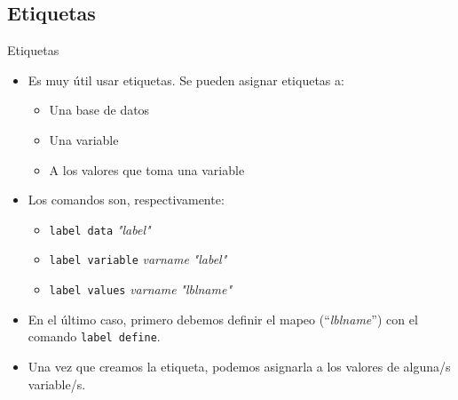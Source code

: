 \documentclass{beamer}
\begin{document}
\subsection{Etiquetas}
\begin{frame}{Etiquetas}
\begin{itemize}
\item Es muy útil usar etiquetas. Se pueden asignar etiquetas a:
\begin{itemize}
\item Una base de datos
\item Una variable
\item A los valores que toma una variable  
\end{itemize}
\item Los comandos son, respectivamente:
\begin{itemize}
\item \texttt{label data} \textit{"label"}
\item \texttt{label variable} \textit{varname} \textit{"label"}
\item \texttt{label values} \textit{varname} \textit{"lblname"} 
\end{itemize}
\item En el último caso, primero debemos definir el mapeo (``\textit{lblname}'') con el comando \texttt{label define}. 
\item Una vez que creamos la etiqueta, podemos asignarla a los valores de alguna/s variable/s.
\end{itemize}
\end{frame}
\end{document}
